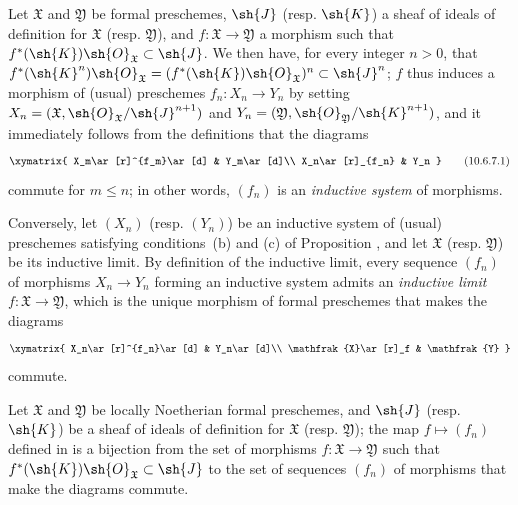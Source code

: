 \begin{env}[10.6.7]
\label{I.10.6.7}
Let $\mathfrak{X}$ and $\mathfrak{Y}$ be formal preschemes, $\sh{J}$ (resp. $\sh{K}$) a sheaf of ideals of definition for $\mathfrak{X}$ (resp. $\mathfrak{Y}$), and $f:\mathfrak{X}\to\mathfrak{Y}$ a morphism such that $f^*(\sh{K})\sh{O}_\mathfrak{X}\subset\sh{J}$.
We then have, for every integer $n>0$, that $f^*(\sh{K}^n)\sh{O}_\mathfrak{X}=(f^*(\sh{K})\sh{O}_\mathfrak{X})^n\subset\sh{J}^n$; $f$ thus induces  a morphism of (usual) preschemes $f_n:X_n\to Y_n$ by setting $X_n=(\mathfrak{X},\sh{O}_\mathfrak{X}/\sh{J}^{n+1})$ and $Y_n=(\mathfrak{Y},\sh{O}_\mathfrak{Y}/\sh{K}^{n+1})$, and it immediately follows from the definitions that the diagrams
\[
\label{I.10.6.7.1}
  \xymatrix{
    X_m\ar[r]^{f_m}\ar[d] &
    Y_m\ar[d]\\
    X_n\ar[r]_{f_n} &
    Y_n
  }
  \tag{10.6.7.1}
\]
commute for $m\leq n$; in other words, $(f_n)$ is an \emph{inductive system} of morphisms.
\end{env}

\begin{env}[10.6.8]
\label{I.10.6.8}
Conversely, let $(X_n)$ (resp. $(Y_n)$) be an inductive system of (usual) preschemes satisfying conditions~(b) and (c) of Proposition , and let $\mathfrak{X}$ (resp. $\mathfrak{Y}$) be its inductive limit.
By definition of the inductive limit, every sequence $(f_n)$ of morphisms $X_n\to Y_n$ forming an inductive system admits an \emph{inductive limit $f:\mathfrak{X}\to\mathfrak{Y}$}, which is the unique morphism of formal preschemes that makes the diagrams
\[
  \xymatrix{
    X_n\ar[r]^{f_n}\ar[d] &
    Y_n\ar[d]\\
    \mathfrak{X}\ar[r]_f &
    \mathfrak{Y}
  }
\]
commute.
\end{env}

\begin{proposition}[10.6.9]
\label{I.10.6.9}
Let $\mathfrak{X}$ and $\mathfrak{Y}$ be locally Noetherian formal preschemes, and $\sh{J}$ (resp. $\sh{K}$) be a sheaf of ideals of definition for $\mathfrak{X}$ (resp. $\mathfrak{Y}$); the map $f\mapsto(f_n)$ defined in  is a bijection from the set of morphisms $f:\mathfrak{X}\to\mathfrak{Y}$ such that $f^*(\sh{K})\sh{O}_\mathfrak{X}\subset\sh{J}$ to the set of sequences $(f_n)$ of morphisms that make the diagrams  commute.
\end{proposition}

